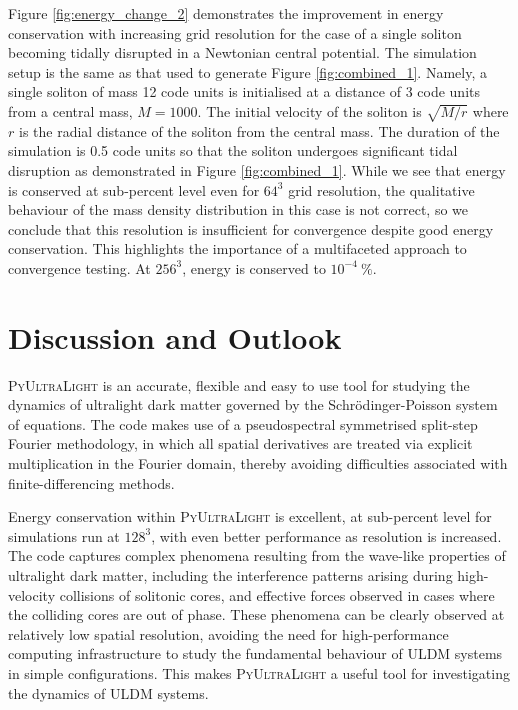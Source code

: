 \documentclass[a4paper,11pt]{article}
\newcommand{\PyUltraLight}{\textsc{PyUltraLight}\xspace}
\begin{document}
Figure \ref{fig:energy_change_2} demonstrates the improvement in energy conservation with increasing grid resolution for the case of a single soliton becoming tidally disrupted in a Newtonian central potential. The simulation setup is the same as that used to generate Figure \ref{fig:combined_1}. Namely, a single soliton of mass 12 code units is initialised at a distance of 3 code units from a central mass, $M=1000$. The initial velocity of the soliton is $\sqrt{M/r}$ where $r$ is the radial distance of the soliton from the central mass. The duration of the simulation is 0.5 code units so that the soliton undergoes significant tidal disruption as demonstrated in Figure \ref{fig:combined_1}. While we see that energy is conserved at sub-percent level even for $64^3$ grid resolution, the qualitative behaviour of the mass density distribution in this case is not correct, so we conclude that this resolution is insufficient for convergence despite good energy conservation. This highlights the importance of a multifaceted approach to convergence testing. At $256^3$, energy is conserved to $10^{-4}\ \%$.

\section{Discussion and Outlook}

\PyUltraLight is an accurate, flexible and easy to use tool for  studying the dynamics of ultralight dark matter governed by the Schr{\"o}dinger-Poisson system of equations. The code makes use of a pseudospectral symmetrised split-step Fourier methodology, in which all spatial derivatives are treated via explicit multiplication in the Fourier domain, thereby avoiding difficulties associated with finite-differencing methods. 

Energy conservation within \PyUltraLight is excellent, at sub-percent level for simulations run at $128^3$, with even better performance as resolution is increased. The code captures complex phenomena resulting from the wave-like properties of ultralight dark matter, including the interference patterns arising during high-velocity collisions of solitonic cores, and  effective forces observed in cases where the colliding cores are out of phase. These phenomena can be clearly observed at relatively low spatial resolution, avoiding the need for high-performance computing infrastructure to study the fundamental behaviour of ULDM systems in simple configurations. This makes \PyUltraLight a useful tool for investigating the  dynamics of ULDM systems. 
\end{document}
